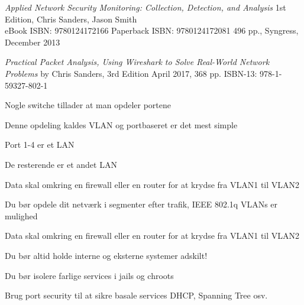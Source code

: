 \documentclass[Screen16to9,17pt]{foils}
\begin{document}


\emph{Applied Network Security Monitoring: Collection, Detection, and Analysis}
1st Edition, Chris Sanders, Jason Smith\\
eBook ISBN: 9780124172166 Paperback ISBN: 9780124172081 496 pp., Syngress, December 2013

{\small{}}



\emph{Practical Packet Analysis,
Using Wireshark to Solve Real-World Network Problems}
by Chris Sanders, 3rd Edition
April 2017, 368 pp.
ISBN-13:
978-1-59327-802-1







\begin{list1}
\item Nogle switche tillader at man opdeler portene
\item Denne opdeling kaldes VLAN og portbaseret er det mest simple
\item Port 1-4 er et LAN
\item De resterende er et andet LAN
\item Data skal omkring en firewall eller en router for at krydse fra VLAN1 til VLAN2
\end{list1}




\begin{list1}
\item Du bør opdele dit netværk i segmenter efter trafik, IEEE 802.1q VLANs er mulighed
\item Data skal omkring en firewall eller en router for at krydse fra VLAN1 til VLAN2
\item Du bør altid holde interne og eksterne systemer adskilt!
\item Du bør isolere farlige services i jails og chroots
\item Brug port security til at sikre basale services DHCP, Spanning Tree osv.
\end{list1}
\end{document}
